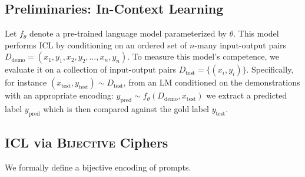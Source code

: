 \documentclass[11pt]{article}
\begin{document}
\subsection{Preliminaries: In-Context Learning}
Let $f_\theta$ denote a pre-trained language model parameterized by $\theta$. This model performs ICL by conditioning on an ordered set of $n$-many input-output pairs $D_\text{demo}= (x_1, y_1, x_2, y_2, \hdots, x_n, y_n)$.
To measure this model's competence, we evaluate it on a collection of input-output pairs $D_\text{test} = \{(x_i, y_i)\}$. Specifically, for instance $(x_\text{test}, y_\text{test}) \sim D_\text{test}$, from an LM conditioned on the demonstrations with an appropriate encoding:
$y_\text{pred}\sim f_\theta(D_\text{demo}, x_\text{test})$ we extract a predicted label $y_\text{pred}$ which is then compared against the gold label  $y_\text{test}$.


\subsection{ICL via \textsc{Bijective} Ciphers}
\label{subsec:iclciphers}
We formally define a bijective encoding of prompts.
\end{document}
